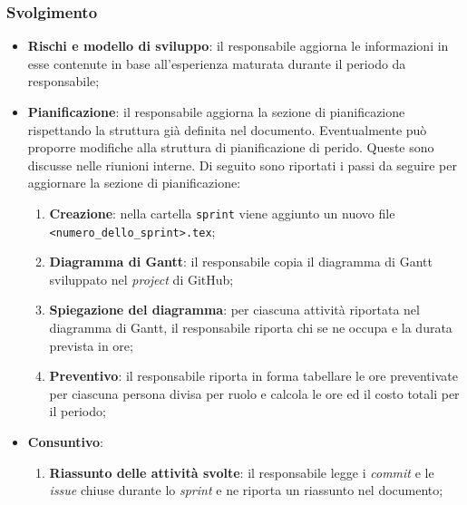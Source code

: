 \subsubsection{Svolgimento}
\begin{itemize}
	\item \textbf{Rischi e modello di sviluppo}: il responsabile aggiorna
	      le informazioni in esse contenute in base all'esperienza maturata
	      durante il periodo da responsabile;

	\item \textbf{Pianificazione}: il responsabile aggiorna la sezione di
	      pianificazione rispettando la struttura già definita nel documento.
	      Eventualmente può proporre modifiche alla struttura di pianificazione
	      di perido. Queste sono discusse nelle riunioni interne.
	      Di seguito sono riportati i passi da seguire per aggiornare la sezione
	      di pianificazione:
	      \begin{enumerate}
		      \item \textbf{Creazione}: nella cartella \texttt{sprint} viene
		            aggiunto un nuovo file \\ \texttt{<numero\_dello\_sprint>.tex};

		      \item \textbf{Diagramma di Gantt}: il responsabile copia il
		            diagramma di Gantt sviluppato nel \textit{project} di
		            GitHub\g;

		      \item \textbf{Spiegazione del diagramma}: per ciascuna attività
		            riportata nel diagramma di Gantt, il responsabile riporta
		            chi se ne occupa e la durata prevista in ore;

		      \item \textbf{Preventivo}: il responsabile riporta in forma
		            tabellare le ore preventivate per ciascuna persona divisa
		            per ruolo e calcola le ore ed il costo totali per il
		            periodo;
	      \end{enumerate}

	\item \textbf{Consuntivo}:
	      \begin{enumerate}
		      \item \textbf{Riassunto delle attività svolte}: il responsabile
		            legge i \textit{commit} e le \textit{issue\g} chiuse durante
		            lo \textit{sprint} e ne riporta un riassunto nel documento;


\end{enumerate}
\end{itemize}
